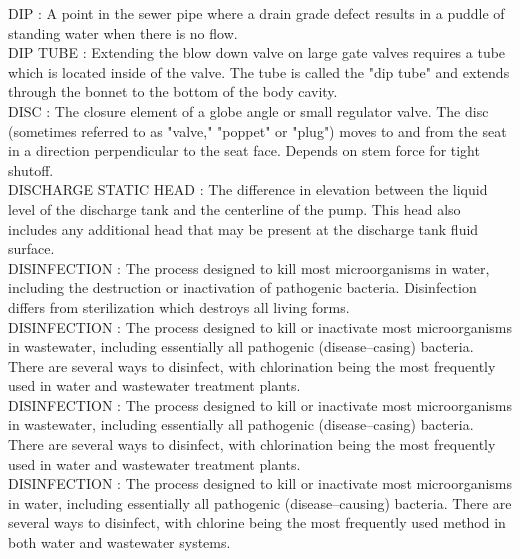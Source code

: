 \vspace{0.15cm}
DIP :  A point in the sewer pipe where a drain grade defect results in a puddle of standing water when there is no flow. \\
\vspace{0.15cm}
DIP TUBE :   Extending the blow down valve on large gate valves requires a tube which is located inside of the valve. The tube is called the "dip tube" and extends through the bonnet to the bottom of the body cavity.\\
\vspace{0.15cm}
DISC :   The closure element of a globe angle or small regulator valve. The disc (sometimes referred to as "valve," "poppet" or "plug") moves to and from the seat in a direction perpendicular to the seat face. Depends on stem force for tight shutoff.\\
\vspace{0.15cm}
DISCHARGE STATIC HEAD :   The difference in elevation between the liquid level of the discharge tank and the centerline of the pump. This head also includes any additional head that may be present at the discharge tank fluid surface.\\
\vspace{0.15cm}
DISINFECTION :  The process designed to kill most microorganisms in water, including the destruction or inactivation of pathogenic bacteria. Disinfection differs from sterilization which destroys all living forms.\\
\vspace{0.15cm}
DISINFECTION :  The process designed to kill or inactivate most microorganisms in wastewater, including essentially all pathogenic (disease–casing) bacteria.   There are several ways to disinfect, with chlorination being the most frequently used in water and wastewater treatment plants.\\
\vspace{0.15cm}
DISINFECTION :  The process designed to kill or inactivate most microorganisms in wastewater, including essentially all pathogenic (disease–casing) bacteria.   There are several ways to disinfect, with chlorination being the most frequently used in water and wastewater treatment plants.\\
\vspace{0.15cm}
DISINFECTION :  The process designed to kill or inactivate most microorganisms in water, including essentially all pathogenic (disease–causing) bacteria. There are several ways to disinfect, with chlorine being the most frequently used method in both water and wastewater systems. \\
